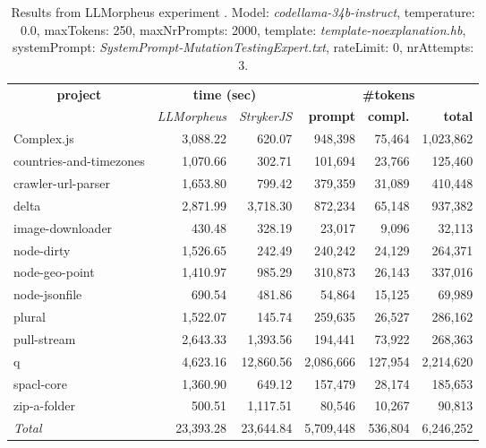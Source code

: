 
\begin{table*}[hbt!]
\centering
{\scriptsize
\begin{tabular}{l||r|r|r|r|r}
\multicolumn{1}{c|}{\bf project} & \multicolumn{2}{|c|}{\bf time (sec)} & \multicolumn{3}{|c|}{\bf \#tokens} \\
               & {\it LLMorpheus} & {\it StrykerJS} & {\bf prompt} & {\bf compl.} & {\bf total} \\
\hline
  Complex.js & 3,088.22 & 620.07 & 948,398 & 75,464 & 1,023,862 \\ 
countries-and-timezones & 1,070.66 & 302.71 & 101,694 & 23,766 & 125,460 \\ 
crawler-url-parser & 1,653.80 & 799.42 & 379,359 & 31,089 & 410,448 \\ 
delta & 2,871.99 & 3,718.30 & 872,234 & 65,148 & 937,382 \\ 
image-downloader & 430.48 & 328.19 & 23,017 & 9,096 & 32,113 \\ 
node-dirty & 1,526.65 & 242.49 & 240,242 & 24,129 & 264,371 \\ 
node-geo-point & 1,410.97 & 985.29 & 310,873 & 26,143 & 337,016 \\ 
node-jsonfile & 690.54 & 481.86 & 54,864 & 15,125 & 69,989 \\ 
plural & 1,522.07 & 145.74 & 259,635 & 26,527 & 286,162 \\ 
pull-stream & 2,643.33 & 1,393.56 & 194,441 & 73,922 & 268,363 \\ 
q & 4,623.16 & 12,860.56 & 2,086,666 & 127,954 & 2,214,620 \\ 
spacl-core & 1,360.90 & 649.12 & 157,479 & 28,174 & 185,653 \\ 
zip-a-folder & 500.51 & 1,117.51 & 80,546 & 10,267 & 90,813 \\ 
\hline
  \textit{Total} & 23,393.28 & 23,644.84 & 5,709,448 & 536,804 & 6,246,252 \\
  \end{tabular}
  }
  \\[2mm]
  \caption{Results from LLMorpheus experiment .
    Model: \textit{codellama-34b-instruct}, 
    temperature: 0.0, 
    maxTokens: 250, 
    maxNrPrompts: 2000, 
    template: \textit{template-noexplanation.hb}, 
    systemPrompt: \textit{SystemPrompt-MutationTestingExpert.txt}, 
    rateLimit: 0, 
    nrAttempts: 3.  
  }
  \label{table:Cost:run374:codellama-34b-instruct:template-noexplanation.hb:0.0}
\end{table*}